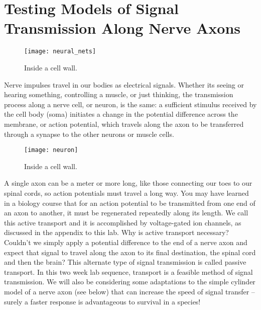\chapter{Testing Models of Signal Transmission Along Nerve Axons}
\thispagestyle{fancy}
%
\begin{wrapfigure}{r}{0.5\textwidth}
  \vspace{-20pt}  
  \begin{center}
    \texttt{[image: neural\_nets]}
  \end{center}
  \caption{Inside a cell wall.}
  \label{fig:neural_net}
  \vspace{-20pt}
\end{wrapfigure}
Nerve impulses travel in our bodies as electrical signals. 
Whether its seeing or hearing something, controlling a muscle, or just thinking, the transmission process along a nerve cell, or neuron, is the same: a sufficient stimulus received by the cell body (soma) initiates a change in the potential difference across the membrane, or action potential, which travels along the axon to be transferred through a synapse to the other neurons or muscle cells. 

\begin{wrapfigure}{r}{0.5\textwidth}
  \vspace{-20pt}  
  \begin{center}
    \texttt{[image: neuron]}
  \end{center}
  \caption{Inside a cell wall.}
  \label{fig:neuron}
  \vspace{-20pt}
\end{wrapfigure}

A single axon can be a meter or more long, like those connecting our toes to our spinal cords, so action potentials must travel a long way.
You may have learned in a biology course that for an action potential to be transmitted from one end of an axon to another, it must be regenerated repeatedly along its length.
We call this active transport and it is accomplished by voltage-gated ion channels, as discussed in the appendix to this lab.
Why is active transport necessary?
Couldn't we simply apply a potential difference to the end of a nerve axon and expect that signal to travel along the axon to its final destination, the spinal cord and then the brain?
This alternate type of signal transmission is called passive transport. 
In this two week lab sequence, transport is a feasible method of signal transmission. 
We will also be considering some adaptations to the simple cylinder model of a nerve axon (see below) that can increase the speed of signal transfer – surely a faster response is advantageous to survival in a species!

